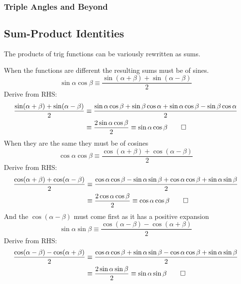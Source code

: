 \documentclass[fleqn,a4paper,11pt]{article}
\begin{document}
    \subsubsection{Triple Angles and Beyond}

    \subsection{Sum-Product Identities} \label{sec_trig_sum_product}

    The products of trig functions can be variously rewritten as sums.

    When the functions are different the resulting sums must be of sines.
    \begin{equation}
    \sin \alpha \cos \beta \equiv
        \frac{\sin(\alpha + \beta) + \sin(\alpha - \beta)} 2
    \end{equation}
    Derive from RHS:
    \begin{align*}
    \frac{\sin(\alpha + \beta) + \sin(\alpha - \beta)} 2 &\equiv
     \frac{\sin \alpha \cos \beta + \sin \beta \cos \alpha +
           \sin \alpha \cos \beta - \sin \beta \cos \alpha} 2 \\
    &\equiv \frac{2 \sin \alpha \cos \beta} 2 \equiv \sin \alpha \cos \beta \qed
    \end{align*}
    When they are the same they must be of cosines
    \begin{equation}
    \cos \alpha \cos \beta \equiv
     \frac{\cos(\alpha + \beta) + \cos(\alpha - \beta)} 2
    \end{equation}
    Derive from RHS:
    \begin{align*}
    \frac{\cos(\alpha + \beta) + \cos(\alpha - \beta)} 2 &\equiv
     \frac{\cos \alpha \cos \beta - \sin \alpha \sin \beta +
           \cos \alpha \cos \beta + \sin \alpha \sin \beta} 2 \\
    &\equiv \frac{2 \cos \alpha \cos \beta} 2 \equiv \cos \alpha \cos \beta \qed
    \end{align*}
    And the \(\cos(\alpha - \beta)\) must come first as it has a positive
    expansion
    \begin{equation}
    \sin \alpha \sin \beta \equiv
     \frac{\cos(\alpha - \beta) - \cos(\alpha + \beta)} 2
    \end{equation}
    Derive from RHS:
    \begin{align*}
    \frac{\cos(\alpha - \beta) - \cos(\alpha + \beta)} 2 &\equiv
     \frac{\cos \alpha \cos \beta + \sin \alpha \sin \beta -
           \cos \alpha \cos \beta + \sin \alpha \sin \beta} 2 \\
    &\equiv \frac{2 \sin \alpha \sin \beta} 2 \equiv \sin \alpha \sin \beta \qed
    \end{align*}
\end{document}
